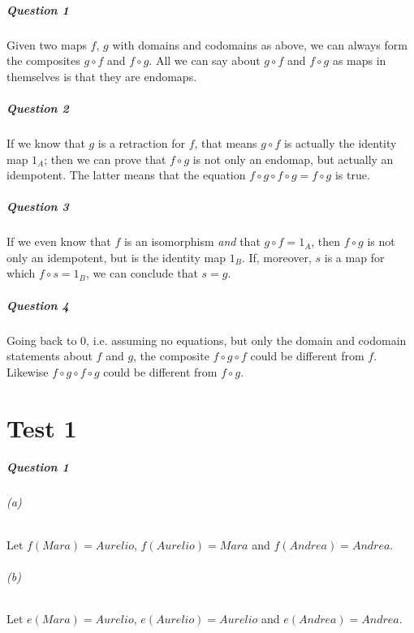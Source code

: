 \documentclass{report}
\begin{document}
    \paragraph{Question 1}
    Given two maps $f$, $g$ with domains and codomains as above, we can always form the composites
    $g \circ f$ and $f \circ g$. All we can say about $g \circ f$ and $f \circ g$ as maps in themselves is
    that they are endomaps.

    \paragraph{Question 2}
    If we know that $g$ is a retraction for $f$, that means $g \circ f$ is actually the identity map $1_A$;
    then we can prove that $f \circ g$ is not only an endomap, but actually an idempotent. The latter means
    that the equation $f \circ g \circ f \circ g = f \circ g$ is true.

    \paragraph{Question 3}
    If we even know that $f$ is an isomorphism \emph{and} that $g \circ f = 1_A$, then $f \circ g$ is not
    only an idempotent, but is the identity map $1_B$. If, moreover, $s$ is a map for which $f \circ s =
    1_B$, we can conclude that $s = g$.

    \paragraph{Question 4}
    Going back to 0, i.e. assuming no equations, but only the domain and codomain statements about $f$ and $g$,
    the composite $f \circ g \circ f$ could be different from $f$. Likewise $f \circ g \circ f \circ g$
    could be different from $f \circ g$.

    \chapter{Test 1}

    \paragraph{Question 1}
    \subparagraph{(a)}
    Let $f(Mara) = Aurelio$, $f(Aurelio) = Mara$ and $f(Andrea) = Andrea$.

    \subparagraph{(b)}
    Let $e(Mara) = Aurelio$, $e(Aurelio) = Aurelio$ and $e(Andrea) = Andrea$.
\end{document}
